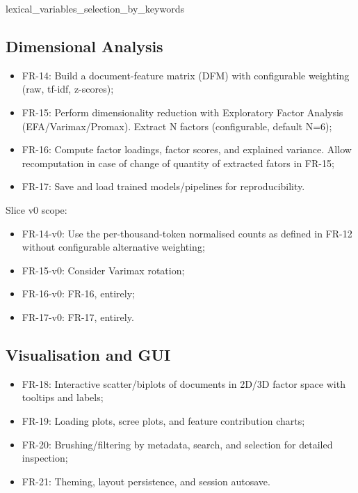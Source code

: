 {lexical_variables_selection_by_keywords}


\subsection{Dimensional Analysis}

\begin{itemize}
    \item FR-14: Build a document-feature matrix (DFM) with configurable weighting (raw, tf-idf, z-scores);
    \item FR-15: Perform dimensionality reduction with Exploratory Factor Analysis (EFA/Varimax/Promax). Extract N factors (configurable, default N=6);
    \item FR-16: Compute factor loadings, factor scores, and explained variance. Allow recomputation in case of change of quantity of extracted fators in FR-15;
    \item FR-17: Save and load trained models/pipelines for reproducibility.
\end{itemize}

Slice v0 scope:

\begin{itemize}
    \item FR-14-v0: Use the per-thousand-token normalised counts as defined in FR-12 without configurable alternative weighting;
    \item FR-15-v0: Consider Varimax rotation;
    \item FR-16-v0: FR-16, entirely;
    \item FR-17-v0: FR-17, entirely.
\end{itemize}

\subsection{Visualisation and GUI}

\begin{itemize}
    \item FR-18: Interactive scatter/biplots of documents in 2D/3D factor space with tooltips and labels;
    \item FR-19: Loading plots, scree plots, and feature contribution charts;
    \item FR-20: Brushing/filtering by metadata, search, and selection for detailed inspection;
    \item FR-21: Theming, layout persistence, and session autosave.
\end{itemize}

